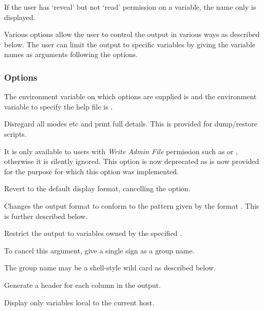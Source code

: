 If the user has `reveal' but not `read' permission on a variable, the name only is displayed.

Various options allow the user to control the output in various ways as described below. The user can limit the output to specific variables by
giving the variable names as arguments following the options.

\subsubsection{Options}
The environment variable on which options are supplied is \filename{\BtvlistVarname} and the environment variable to specify the
help file is .

\explainopt


Disregard all modes etc and print full details. This is provided for dump/restore scripts.

It is only available to users with \textit{Write Admin File} permission such as \batchuser{} or , otherwise it is silently ignored.
This option is now deprecated as \PrXbCvlist{} is now provided for the purpose for which this option was implemented.


Revert to the default display format, cancelling the  option.


Changes the output format to conform to the pattern given by the format . This is further described below.


Restrict the output to variables owned by the specified .

To cancel this argument, give a single \exampletext{{}-} sign as a group name.

The group name may be a shell-style wild card as described below.


Generate a header for each column in the output.


Display only variables local to the current host.


